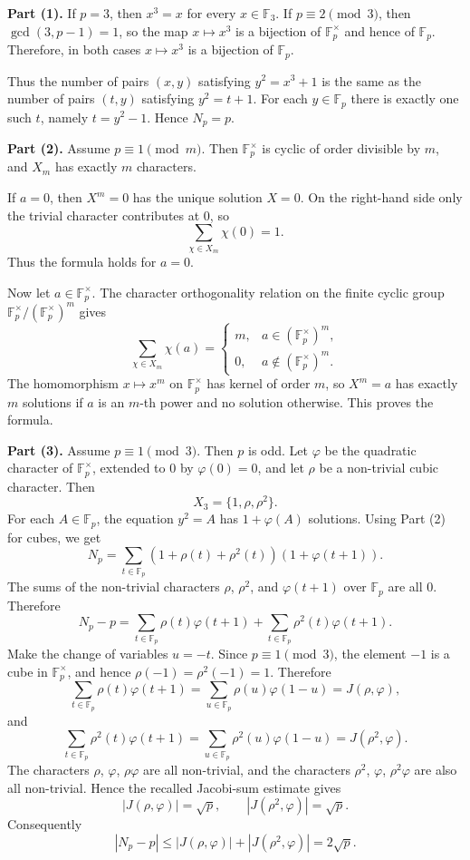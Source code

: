 \begin{solution}
\textbf{Part (1).}
If $p=3$, then $x^3=x$ for every $x\in \mathbb{F}_3$. If $p\equiv 2\pmod 3$, then $\gcd(3,p-1)=1$, so the map $x\mapsto x^3$ is a bijection of $\mathbb{F}_p^\times$ and hence of $\mathbb{F}_p$. Therefore, in both cases $x\mapsto x^3$ is a bijection of $\mathbb{F}_p$.

Thus the number of pairs $(x,y)$ satisfying $y^2=x^3+1$ is the same as the number of pairs $(t,y)$ satisfying $y^2=t+1$. For each $y\in \mathbb{F}_p$ there is exactly one such $t$, namely $t=y^2-1$. Hence $N_p=p$.

\textbf{Part (2).}
Assume $p\equiv 1\pmod m$. Then $\mathbb{F}_p^\times$ is cyclic of order divisible by $m$, and $X_m$ has exactly $m$ characters.

If $a=0$, then $X^m=0$ has the unique solution $X=0$. On the right-hand side only the trivial character contributes at $0$, so
\[
\sum_{\chi\in X_m}\chi(0)=1.
\]
Thus the formula holds for $a=0$.

Now let $a\in \mathbb{F}_p^\times$. The character orthogonality relation on the finite cyclic group $\mathbb{F}_p^\times/(\mathbb{F}_p^\times)^m$ gives
\[
\sum_{\chi\in X_m}\chi(a)
=
\begin{cases}
m, & a\in (\mathbb{F}_p^\times)^m,\\
0, & a\notin (\mathbb{F}_p^\times)^m.
\end{cases}
\]
The homomorphism $x\mapsto x^m$ on $\mathbb{F}_p^\times$ has kernel of order $m$, so $X^m=a$ has exactly $m$ solutions if $a$ is an $m$-th power and no solution otherwise. This proves the formula.

\textbf{Part (3).}
Assume $p\equiv 1\pmod 3$. Then $p$ is odd. Let $\varphi$ be the quadratic character of $\mathbb{F}_p^\times$, extended to $0$ by $\varphi(0)=0$, and let $\rho$ be a non-trivial cubic character. Then
\[
X_3=\{1,\rho,\rho^2\}.
\]
For each $A\in \mathbb{F}_p$, the equation $y^2=A$ has $1+\varphi(A)$ solutions. Using Part (2) for cubes, we get
\[
N_p
=
\sum_{t\in \mathbb{F}_p}
\left(1+\rho(t)+\rho^2(t)\right)
\left(1+\varphi(t+1)\right).
\]
The sums of the non-trivial characters $\rho$, $\rho^2$, and $\varphi(t+1)$ over $\mathbb{F}_p$ are all $0$. Therefore
\[
N_p-p
=
\sum_{t\in \mathbb{F}_p}\rho(t)\varphi(t+1)
+
\sum_{t\in \mathbb{F}_p}\rho^2(t)\varphi(t+1).
\]
Make the change of variables $u=-t$. Since $p\equiv 1\pmod 3$, the element $-1$ is a cube in $\mathbb{F}_p^\times$, and hence $\rho(-1)=\rho^2(-1)=1$. Therefore
\[
\sum_{t\in \mathbb{F}_p}\rho(t)\varphi(t+1)
=
\sum_{u\in \mathbb{F}_p}\rho(u)\varphi(1-u)
=
J(\rho,\varphi),
\]
and
\[
\sum_{t\in \mathbb{F}_p}\rho^2(t)\varphi(t+1)
=
\sum_{u\in \mathbb{F}_p}\rho^2(u)\varphi(1-u)
=
J(\rho^2,\varphi).
\]
The characters $\rho$, $\varphi$, $\rho\varphi$ are all non-trivial, and the characters $\rho^2$, $\varphi$, $\rho^2\varphi$ are also all non-trivial. Hence the recalled Jacobi-sum estimate gives
\[
|J(\rho,\varphi)|=\sqrt p,
\qquad
|J(\rho^2,\varphi)|=\sqrt p.
\]
Consequently
\[
|N_p-p|
\leq
|J(\rho,\varphi)|+|J(\rho^2,\varphi)|
=2\sqrt p.
\]
\end{solution}

